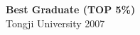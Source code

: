 \documentclass[margin,line]{res}
\newenvironment{list2}{
  \begin{list}{$\bullet$}{%
      \setlength{\itemsep}{0in}
      \setlength{\parsep}{0in} \setlength{\parskip}{0in}
      \setlength{\topsep}{0in} \setlength{\partopsep}{0in}
      \setlength{\leftmargin}{0.2in}}}{\end{list}}
\begin{document}
\begin{resume}
{\bf Best Graduate (TOP 5\%)} \\
Tongji University \hfill  { 2007}
%
%
%
%



\end{resume}
\end{document}

